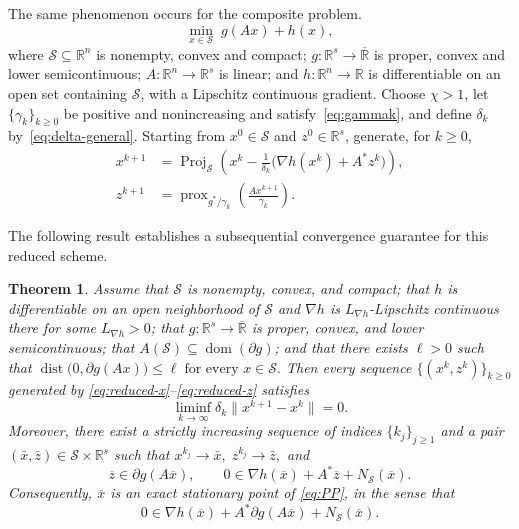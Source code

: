 \documentclass[11pt]{article}
\numberwithin{equation}{section}
\newtheorem{theorem}{Theorem}[section]
\newcommand{\dist}{\operatorname{dist}}
\newcommand{\prox}{\operatorname{prox}}
\newcommand{\Proj}{\operatorname{Proj}}
\DeclareMathOperator{\dom}{dom}
\begin{document}
The same phenomenon  occurs for the  composite
problem.
\begin{equation}\label{eq:PP}
    \min_{x\in\mathcal S}\; g(Ax)+h(x),
\end{equation}
where $\mathcal S\subseteq\mathbb R^n$ is nonempty, convex and compact;
$g:\mathbb R^s\to\overline{\mathbb R}$ is proper, convex and lower
semicontinuous; $A:\mathbb R^n\to\mathbb R^s$ is linear; and
$h:\mathbb R^n\to\mathbb R$ is differentiable on an open set containing
$\mathcal S$, with a Lipschitz continuous gradient. Choose $\chi>1$, let $\{\gamma_k\}_{k\ge0}$ be positive and
nonincreasing and satisfy~\eqref{eq:gammak}, and define
$\delta_k$ by~\eqref{eq:delta-general}.
Starting from $x^0\in\mathcal S$ and $z^0\in\mathbb R^s$,
generate, for $k\geq 0$,
\begin{align}
x^{k+1}
&=
\Proj_{\mathcal S}\left(
x^k-\frac{1}{\delta_k}
\bigl(\nabla h(x^k)+A^*z^k\bigr)
\right),
\label{eq:reduced-x}\\
z^{k+1}
&=
\prox_{g^*/\gamma_k}
\left(\frac{Ax^{k+1}}{\gamma_k}\right).
\label{eq:reduced-z}
\end{align}

The following result establishes a subsequential convergence guarantee for
this reduced scheme.

\begin{theorem}\label{cor:reduced-subsequential}
Assume that $\mathcal S$ is nonempty,  convex, and compact; that
$h$ is differentiable on an open neighborhood of $\mathcal S$ and
$\nabla h$ is $L_{\nabla h}$-Lipschitz continuous there for some
$L_{\nabla h}>0$; that $g:\mathbb R^s\to\overline{\mathbb R}$ is proper, convex, and lower
semicontinuous; that
$A(\mathcal S)\subseteq\dom(\partial g)$; and that there exists
$\ell>0$ such that
$
    \dist\bigl(0,\partial g(Ax)\bigr)\leq\ell
    \;\text{for every }x\in\mathcal S.
$
Then every sequence $\{(x^k,z^k)\}_{k\ge 0}$ generated by
\eqref{eq:reduced-x}--\eqref{eq:reduced-z} satisfies
\begin{equation}\label{eq:reduced-liminf}
    \liminf_{k\to\infty}
    \delta_k\|x^{k+1}-x^k\|=0.
\end{equation}
Moreover, there exist a strictly increasing sequence of indices
\(\{k_j\}_{j\geq1}\) and a pair
\((\bar x,\bar z)\in\mathcal S\times\mathbb R^s\) such that
$
    x^{k_j}\to\bar x,\; z^{k_j}\to\bar z,
$
 and
\begin{equation}\label{eq:reduced-lifted-stationarity}
    \overline z\in\partial g(A\overline x),
    \qquad
    0\in
    \nabla h(\overline x)+A^*\overline z+N_{\mathcal S}(\overline x).
\end{equation}
Consequently, $\overline x$ is an exact stationary point of \eqref{eq:PP}, in
the sense that
\begin{equation}\label{eq:reduced-stationarity}
    0\in
    \nabla h(\overline x)
    +A^*\partial g(A\overline x)
    +N_{\mathcal S}(\overline x).
\end{equation}

\end{theorem}
\end{document}
